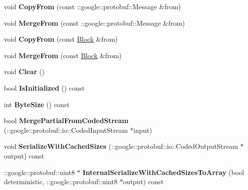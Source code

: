 \begin{DoxyCompactItemize}
void {\bfseries Copy\+From} (const \+::google\+::protobuf\+::\+Message \&from)
\item 
\hypertarget{classstruct_definitions_1_1_block_a161ba04d6f54a2dd97978dffcbbadfdc}{}\label{classstruct_definitions_1_1_block_a161ba04d6f54a2dd97978dffcbbadfdc} 
void {\bfseries Merge\+From} (const \+::google\+::protobuf\+::\+Message \&from)
\item 
\hypertarget{classstruct_definitions_1_1_block_afb7c28ca8c8684d4ec48e5fe2ab22311}{}\label{classstruct_definitions_1_1_block_afb7c28ca8c8684d4ec48e5fe2ab22311} 
void {\bfseries Copy\+From} (const \hyperlink{classstruct_definitions_1_1_block}{Block} \&from)
\item 
\hypertarget{classstruct_definitions_1_1_block_aff06c66913cd9649fd7e97fadc5c60a4}{}\label{classstruct_definitions_1_1_block_aff06c66913cd9649fd7e97fadc5c60a4} 
void {\bfseries Merge\+From} (const \hyperlink{classstruct_definitions_1_1_block}{Block} \&from)
\item 
\hypertarget{classstruct_definitions_1_1_block_aeee0943e1cfc14e8e7767927d5c33c3c}{}\label{classstruct_definitions_1_1_block_aeee0943e1cfc14e8e7767927d5c33c3c} 
void {\bfseries Clear} ()
\item 
\hypertarget{classstruct_definitions_1_1_block_aa91d4e26aa3b8e08bb41bf57516af6f5}{}\label{classstruct_definitions_1_1_block_aa91d4e26aa3b8e08bb41bf57516af6f5} 
bool {\bfseries Is\+Initialized} () const
\item 
\hypertarget{classstruct_definitions_1_1_block_a08c11dd38a123b72d7a67e1156d2c12e}{}\label{classstruct_definitions_1_1_block_a08c11dd38a123b72d7a67e1156d2c12e} 
int {\bfseries Byte\+Size} () const
\item 
\hypertarget{classstruct_definitions_1_1_block_a36641b4ab3d66dc939ff6842a6a4d3f8}{}\label{classstruct_definitions_1_1_block_a36641b4ab3d66dc939ff6842a6a4d3f8} 
bool {\bfseries Merge\+Partial\+From\+Coded\+Stream} (\+::google\+::protobuf\+::io\+::\+Coded\+Input\+Stream $\ast$input)
\item 
\hypertarget{classstruct_definitions_1_1_block_af88c47a2687b43ec7337fd5f2bcb8dde}{}\label{classstruct_definitions_1_1_block_af88c47a2687b43ec7337fd5f2bcb8dde} 
void {\bfseries Serialize\+With\+Cached\+Sizes} (\+::google\+::protobuf\+::io\+::\+Coded\+Output\+Stream $\ast$output) const
\item 
\hypertarget{classstruct_definitions_1_1_block_a571513ee46ca149e67904e648fa940b4}{}\label{classstruct_definitions_1_1_block_a571513ee46ca149e67904e648fa940b4} 
\+::google\+::protobuf\+::uint8 $\ast$ {\bfseries Internal\+Serialize\+With\+Cached\+Sizes\+To\+Array} (bool deterministic, \+::google\+::protobuf\+::uint8 $\ast$output) const

\end{DoxyCompactItemize}
